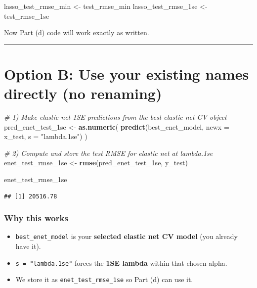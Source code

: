 \documentclass[
]{article}
\newenvironment{Shaded}{\begin{snugshade}}{\end{snugshade}}
\newcommand{\AttributeTok}[1]{\textcolor[rgb]{0.13,0.29,0.53}{#1}}
\newcommand{\CommentTok}[1]{\textcolor[rgb]{0.56,0.35,0.01}{\textit{#1}}}
\newcommand{\FunctionTok}[1]{\textcolor[rgb]{0.13,0.29,0.53}{\textbf{#1}}}
\newcommand{\NormalTok}[1]{#1}
\newcommand{\OtherTok}[1]{\textcolor[rgb]{0.56,0.35,0.01}{#1}}
\newcommand{\StringTok}[1]{\textcolor[rgb]{0.31,0.60,0.02}{#1}}
\providecommand{\tightlist}{%
  \setlength{\itemsep}{0pt}\setlength{\parskip}{0pt}}
\begin{document}
\begin{Shaded}
\begin{Highlighting}[]
\NormalTok{lasso\_test\_rmse\_min }\OtherTok{\textless{}{-}}\NormalTok{ test\_rmse\_min}
\NormalTok{lasso\_test\_rmse\_1se }\OtherTok{\textless{}{-}}\NormalTok{ test\_rmse\_1se}
\end{Highlighting}
\end{Shaded}

Now Part (d) code will work exactly as written.

\begin{center}\rule{0.5\linewidth}{0.5pt}\end{center}

\section{Option B: Use your existing names directly (no
renaming)}\label{option-b-use-your-existing-names-directly-no-renaming}

\begin{Shaded}
\begin{Highlighting}[]
\CommentTok{\# 1) Make elastic net 1SE predictions from the best elastic net CV object}
\NormalTok{pred\_enet\_test\_1se }\OtherTok{\textless{}{-}} \FunctionTok{as.numeric}\NormalTok{(}
  \FunctionTok{predict}\NormalTok{(best\_enet\_model, }\AttributeTok{newx =}\NormalTok{ x\_test, }\AttributeTok{s =} \StringTok{"lambda.1se"}\NormalTok{)}
\NormalTok{)}

\CommentTok{\# 2) Compute and store the test RMSE for elastic net at lambda.1se}
\NormalTok{enet\_test\_rmse\_1se }\OtherTok{\textless{}{-}} \FunctionTok{rmse}\NormalTok{(pred\_enet\_test\_1se, y\_test)}

\NormalTok{enet\_test\_rmse\_1se}
\end{Highlighting}
\end{Shaded}

\begin{verbatim}
## [1] 20516.78
\end{verbatim}

\subsubsection{Why this works}\label{why-this-works}

\begin{itemize}
\tightlist
\item
  \texttt{best\_enet\_model} is your \textbf{selected elastic net CV
  model} (you already have it).
\item
  \texttt{s\ =\ "lambda.1se"} forces the \textbf{1SE lambda} within that
  chosen alpha.
\item
  We store it as \texttt{enet\_test\_rmse\_1se} so Part (d) can use it.
\end{itemize}
\end{document}
